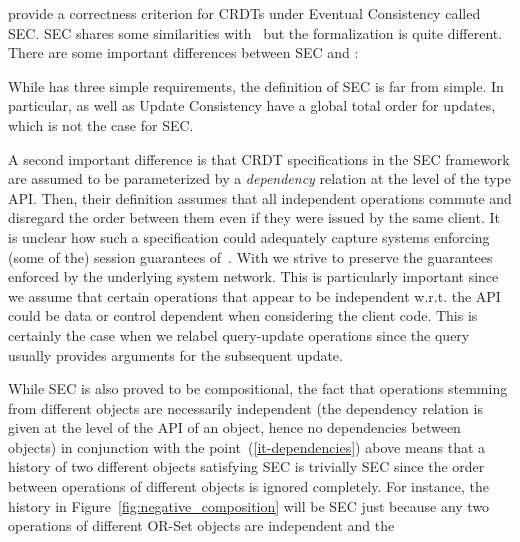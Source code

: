 \citet{JagadeesanR18} provide a correctness criterion for CRDTs under
Eventual Consistency called SEC.
%
SEC shares some similarities with~\cite{PerrinMJ14} but the
formalization is quite different.
There are some important differences between SEC and \CRDTLinshort{}:
\begin{inparaenum}
\item While \CRDTLinshort{} has three simple requirements, the
  definition of SEC is far from simple.
  In particular, \CRDTLinshort{} as well as Update Consistency have a
  global total order for updates, which is not the case for
  SEC.%
\item
  \label{it-dependencies}
  A second important difference is that CRDT
  specifications in the SEC framework are assumed to be parameterized by a \emph{dependency}
  relation at the level of the type API.
  Then, their definition assumes that all independent operations
  commute %
  and disregard the order between them even if they were issued by the same client.
  It is unclear how such a specification could adequately capture
  systems enforcing (some of the) session guarantees
  of~\cite{TerryDPSTW94}.
  With \CRDTLinshort{} we strive to preserve the guarantees enforced by the
  underlying system network.
  This is particularly important since we assume that certain
  operations that appear to be independent w.r.t. the API could be
  data or control dependent when considering the client code.
  This is certainly the case when we relabel query-update operations
  since the query usually provides arguments for the subsequent
  update.
\item While SEC is also proved to be compositional, 
  the
  fact that operations stemming from different objects are necessarily
  independent (the dependency relation is given at the level of the API
  of an object, hence no dependencies between objects) in conjunction
  with the point~(\ref{it-dependencies}) above means that a history of 
  two different objects satisfying SEC is trivially SEC since the order between
  operations of different objects is ignored completely. For instance, the
  history in Figure~\ref{fig:negative_composition} will be SEC just because
  any two operations of different OR-Set objects are independent and the

\end{inparaenum}
